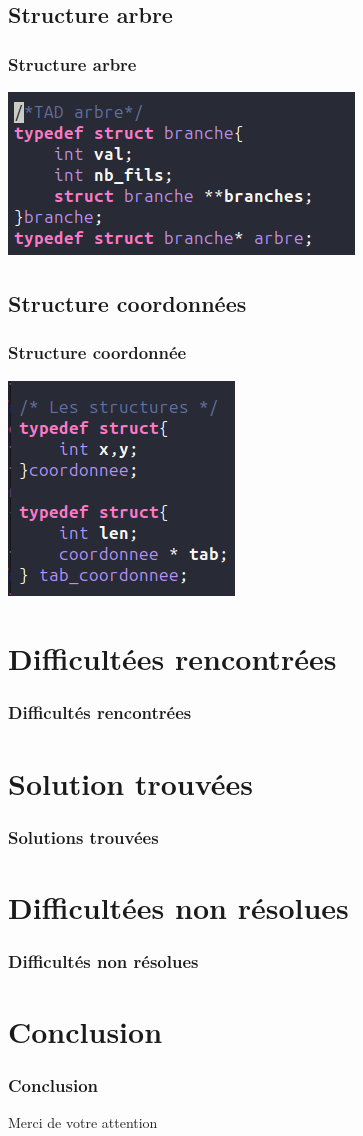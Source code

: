 \documentclass{beamer}
\begin{document}
\subsection{Structure arbre}
\begin{frame}
  \frametitle{Structure arbre}
  \includegraphics[scale=0.4]{fich/struct_arbre.png}
\end{frame}

\subsection{Structure coordonnées}
\begin{frame}
  \frametitle{Structure coordonnée}
  \includegraphics[scale=0.4]{fich/struct_coordonnees.png}
\end{frame}

\section{Difficultées rencontrées}
\begin{frame}
  \frametitle{Difficultés rencontrées}
\end{frame}

\section{Solution trouvées}
\begin{frame}
  \frametitle{Solutions trouvées}
\end{frame}

\section{Difficultées non résolues}
\begin{frame}
  \frametitle{Difficultés non résolues}
\end{frame}

\section{Conclusion}
\begin{frame}
  \frametitle{Conclusion}
  Merci de votre attention
\end{frame}
\end{document}
